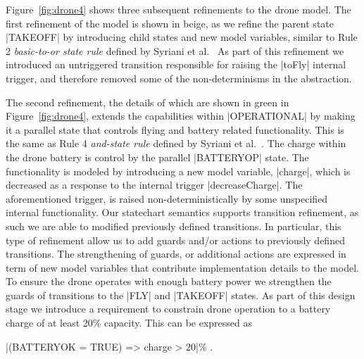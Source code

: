 Figure~\ref{fig:drone4} shows three subsequent refinements to the drone model. The first refinement of the model is shown in beige, as we refine the parent state |TAKEOFF|
by introducing child states and new model variables, similar to 
Rule 2 \emph{basic-to-or state rule} defined by Syriani et al.~\cite{Syriani_2019}
As part of this refinement we introduced an untriggered transition responsible for 
raising the |toFly| internal trigger, and therefore removed some of the non-determinisms in the abstraction.

The second refinement, the details of which are shown in green in Figure~\ref{fig:drone4}, 
extends the capabilities within |OPERATIONAL| by making it a parallel
state that controls flying and battery related functionality. 
This is the same as Rule 4 \emph{and-state rule} defined by Syriani et al.~\cite{Syriani_2019}.
The charge within the drone battery is control by the parallel |BATTERYOP| state. 
The functionality is modeled by introducing a new model variable, |charge|, which is decreased as 
a response to the internal trigger |decreaseCharge|. The aforementioned trigger, is raised non-deterministically by some 
unspecified internal functionality. Our statechart semantics supports transition refinement, as such
we are able to modified previously defined transitions. In particular, this type of refinement allow
us to add guards and/or actions to previously defined transitions. The strengthening of guards, or additional 
actions are expressed in term of new model variables that contribute implementation details to the model.
To ensure the drone operates with enough battery power we strengthen the guards of transitions 
to the |FLY| and |TAKEOFF| states.
As part of this design stage we introduce a requirement to constrain drone operation 
to a battery charge of at least 20\% capacity. This can be expressed as
\begin{center}
  |(BATTERYOK = TRUE) => charge > 20|\% .
\end{center}

